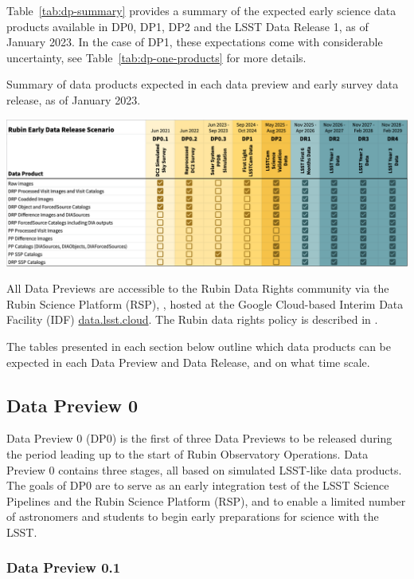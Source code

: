 Table~\ref{tab:dp-summary}  provides a summary of the expected early science data products available in DP0, DP1, DP2 and the LSST Data Release 1, as of January 2023.
In the case of DP1, these expectations come with considerable uncertainty, see Table~\ref{tab:dp-one-products} for more details.
\begin{table}[ht]
\centering
\label{tab:dp-summary}
\caption{Summary of data products expected in each data preview and early survey data release, as of January 2023.}
\includegraphics[width=\linewidth]{figures/DPR-summary}
\end{table}

All Data Previews are accessible to the Rubin Data Rights community via the Rubin Science Platform (RSP), \citep{LSE-319}, hosted at the Google Cloud-based Interim Data Facility (IDF) \url{data.lsst.cloud}.
The Rubin data rights policy is described in  \cite{RDO-013}.

The tables presented in each section below outline which data products can be expected in each Data Preview and Data Release, and on what time scale.

\subsection{Data Preview 0}

Data Preview 0 (DP0) is the first of three Data Previews to be released during the period leading up to the start of Rubin Observatory Operations. 
Data Preview 0 contains three stages, all based on simulated LSST-like data products. 
The goals of DP0 are to serve as an early integration test of the LSST Science Pipelines and the Rubin Science Platform (RSP), and to enable a limited number of astronomers and students to begin early preparations for science with the LSST.

\subsubsection{Data Preview 0.1}

